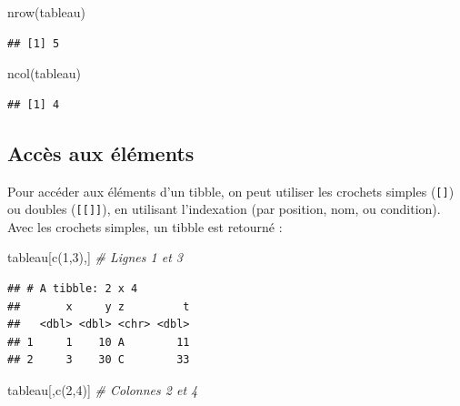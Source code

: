 \documentclass[
  11pt,
]{book}
\newenvironment{Shaded}{\begin{snugshade}}{\end{snugshade}}
\newcommand{\CommentTok}[1]{\textcolor[rgb]{0.56,0.35,0.01}{\textit{#1}}}
\newcommand{\DecValTok}[1]{\textcolor[rgb]{0.00,0.00,0.81}{#1}}
\newcommand{\FunctionTok}[1]{\textcolor[rgb]{0.00,0.00,0.00}{#1}}
\newcommand{\NormalTok}[1]{#1}
\numberwithin{equation}{section}
\numberwithin{countremarque}{section}
\begin{document}
\begin{Shaded}
\begin{Highlighting}[]
\FunctionTok{nrow}\NormalTok{(tableau)}
\end{Highlighting}
\end{Shaded}

\begin{lstlisting}
## [1] 5
\end{lstlisting}

\begin{Shaded}
\begin{Highlighting}[]
\FunctionTok{ncol}\NormalTok{(tableau)}
\end{Highlighting}
\end{Shaded}

\begin{lstlisting}
## [1] 4
\end{lstlisting}

\hypertarget{accuxe8s-aux-uxe9luxe9ments-1}{%
\subsection{Accès aux éléments}\label{accuxe8s-aux-uxe9luxe9ments-1}}

Pour accéder aux éléments d'un tibble, on peut utiliser les crochets simples (\texttt{{[}{]}}) ou doubles (\texttt{{[}{[}{]}{]}}), en utilisant l'indexation (par position, nom, ou condition). Avec les crochets simples, un tibble est retourné :

\begin{Shaded}
\begin{Highlighting}[]
\NormalTok{tableau[}\FunctionTok{c}\NormalTok{(}\DecValTok{1}\NormalTok{,}\DecValTok{3}\NormalTok{),] }\CommentTok{\# Lignes 1 et 3}
\end{Highlighting}
\end{Shaded}

\begin{lstlisting}
## # A tibble: 2 x 4
##       x     y z         t
##   <dbl> <dbl> <chr> <dbl>
## 1     1    10 A        11
## 2     3    30 C        33
\end{lstlisting}

\begin{Shaded}
\begin{Highlighting}[]
\NormalTok{tableau[,}\FunctionTok{c}\NormalTok{(}\DecValTok{2}\NormalTok{,}\DecValTok{4}\NormalTok{)] }\CommentTok{\# Colonnes 2 et 4}
\end{Highlighting}
\end{Shaded}
\end{document}
